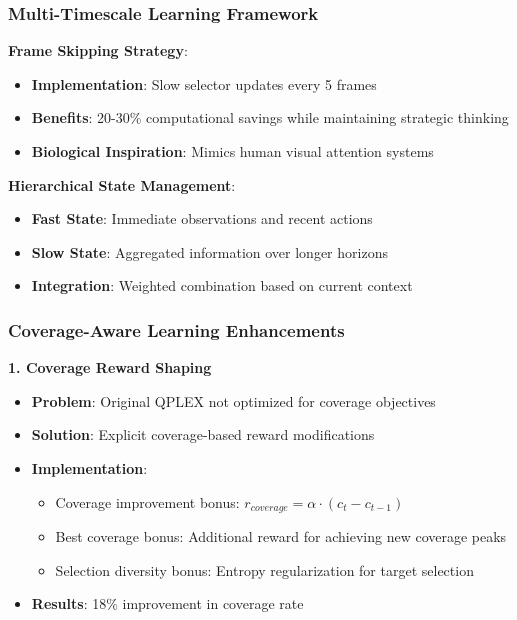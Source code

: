\documentclass[12pt,a4paper]{report}
\begin{document}
\subsubsection{Multi-Timescale Learning Framework}
\textbf{Frame Skipping Strategy}:
\begin{itemize}
\item \textbf{Implementation}: Slow selector updates every 5 frames
\item \textbf{Benefits}: 20-30\% computational savings while maintaining strategic thinking
\item \textbf{Biological Inspiration}: Mimics human visual attention systems
\end{itemize}

\textbf{Hierarchical State Management}:
\begin{itemize}
\item \textbf{Fast State}: Immediate observations and recent actions
\item \textbf{Slow State}: Aggregated information over longer horizons
\item \textbf{Integration}: Weighted combination based on current context
\end{itemize}

\subsubsection{Coverage-Aware Learning Enhancements}
\textbf{1. Coverage Reward Shaping}
\begin{itemize}
\item \textbf{Problem}: Original QPLEX not optimized for coverage objectives
\item \textbf{Solution}: Explicit coverage-based reward modifications
\item \textbf{Implementation}:
\begin{itemize}
\item Coverage improvement bonus: $r_{coverage} = \alpha \cdot (c_t - c_{t-1})$
\item Best coverage bonus: Additional reward for achieving new coverage peaks
\item Selection diversity bonus: Entropy regularization for target selection
\end{itemize}
\item \textbf{Results}: 18\% improvement in coverage rate
\end{itemize}
\end{document}
